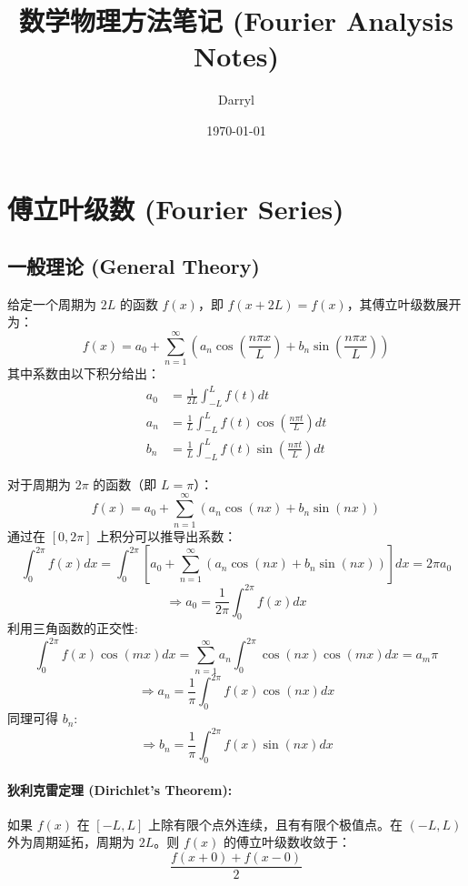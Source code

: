 \documentclass{article}
\begin{document}
	
	\title{数学物理方法笔记 (Fourier Analysis Notes)}
	\author{Darryl}
	\date{\today}
	\maketitle
	
	\section{傅立叶级数 (Fourier Series)}
	
	\subsection{一般理论 (General Theory)}
	给定一个周期为 $2L$ 的函数 $f(x)$，即 $f(x+2L) = f(x)$，其傅立叶级数展开为：
	$$ 
	f(x) = a_0 + \sum_{n=1}^{\infty} (a_n \cos(\frac{n\pi x}{L}) + b_n \sin(\frac{n\pi x}{L})) 
	$$
	其中系数由以下积分给出：
	\begin{align*}
		a_0 &= \frac{1}{2L} \int_{-L}^{L} f(t) dt \\
		a_n &= \frac{1}{L} \int_{-L}^{L} f(t) \cos(\frac{n\pi t}{L}) dt \\
		b_n &= \frac{1}{L} \int_{-L}^{L} f(t) \sin(\frac{n\pi t}{L}) dt
	\end{align*}
	
	对于周期为 $2\pi$ 的函数（即 $L=\pi$）：
	$$ 
	f(x) = a_0 + \sum_{n=1}^{\infty} (a_n \cos(nx) + b_n \sin(nx)) 
	$$
	通过在 $[0, 2\pi]$ 上积分可以推导出系数：
	$$ 
	\int_0^{2\pi} f(x) dx = \int_0^{2\pi} \left[a_0 + \sum_{n=1}^{\infty} (a_n \cos(nx) + b_n \sin(nx))\right] dx = 2\pi a_0 
	$$
	$$ 
	\Rightarrow a_0 = \frac{1}{2\pi} \int_0^{2\pi} f(x) dx 
	$$
	利用三角函数的正交性:
	$$ 
	\int_0^{2\pi} f(x) \cos(mx) dx = \sum_{n=1}^{\infty} a_n \int_0^{2\pi} \cos(nx)\cos(mx)dx = a_m \pi 
	$$
	$$ 
	\Rightarrow a_n = \frac{1}{\pi} \int_0^{2\pi} f(x) \cos(nx) dx 
	$$
	同理可得 $b_n$:
	$$ 
	\Rightarrow b_n = \frac{1}{\pi} \int_0^{2\pi} f(x) \sin(nx) dx 
	$$
	
	\paragraph{狄利克雷定理 (Dirichlet's Theorem):}
	如果 $f(x)$ 在 $[-L, L]$ 上除有限个点外连续，且有有限个极值点。在 $(-L, L)$ 外为周期延拓，周期为 $2L$。则 $f(x)$ 的傅立叶级数收敛于：
	$$ 
	\frac{f(x+0) + f(x-0)}{2} 
	$$
	
\end{document}
